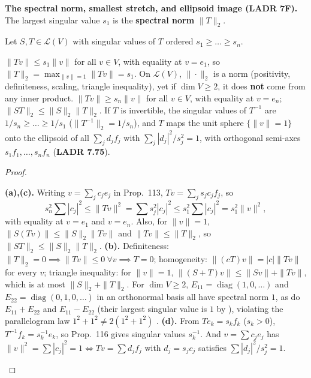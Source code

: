 \documentclass[10pt]{scrartcl}
\newcommand{\LL}{\mathcal L}\newcommand{\PP}{\mathcal P}\newcommand{\MM}{\mathcal M}
\begin{document}
\noindent\textbf{The spectral norm, smallest stretch, and ellipsoid image (LADR 7F).} The largest singular value $s_1$ is the \textbf{spectral norm} $\|T\|_2$.

\begin{theorem*}
  Let $S,T\in\LL(V)$ with singular values of $T$ ordered $s_1\ge\dots\ge s_n$.
  \begin{enumerate}
    \ii[(a)] $\|Tv\|\le s_1\|v\|$ for all $v\in V$, with equality at $v=e_1$, so $\|T\|_2 = \max_{\|v\|=1}\|Tv\| = s_1$.
    \ii[(b)] On $\LL(V)$, $\|\cdot\|_2$ is a norm (positivity, definiteness, scaling, triangle inequality), yet if $\dim V\ge2$, it does \textbf{not} come from any inner product.
    \ii[(c)] $\|Tv\|\ge s_n\|v\|$ for all $v\in V$, with equality at $v=e_n$; $\|ST\|_2\le\|S\|_2\|T\|_2$.
    \ii[(d)] If $T$ is invertible, the singular values of $T^{-1}$ are $1/s_n\ge\dots\ge 1/s_1$ ($\|T^{-1}\|_2=1/s_n$), and $T$ maps the unit sphere $\{\|v\|=1\}$ onto the ellipsoid of all $\sum_{j} d_j f_j$ with $\sum_{j} |d_j|^2/s_j^2 = 1$, with orthogonal semi-axes $s_1f_1,\dots,s_nf_n$ (\textbf{LADR 7.75}).
  \end{enumerate}
\end{theorem*}
\begin{proof}
  \begin{steps}
    \ii \textbf{(a),(c).} Writing $v=\sum_j c_j e_j$ in Prop.~113, $Tv=\sum_j s_j c_j f_j$, so
    \[ s_n^2\sum|c_j|^2 \le \|Tv\|^2 = \sum s_j^2|c_j|^2 \le s_1^2\sum|c_j|^2 = s_1^2\|v\|^2, \]
    with equality at $v=e_1$ and $v=e_n$. Also, for $\|v\|=1$, $\|S(Tv)\|\le\|S\|_2\|Tv\|$ and $\|Tv\|\le\|T\|_2$, so $\|ST\|_2\le\|S\|_2\|T\|_2$.
    \ii \textbf{(b).} Definiteness: $\|T\|_2=0\implies\|Tv\|\le0\ \forall v\implies T=0$; homogeneity: $\|(cT)v\|=|c|\|Tv\|$ for every $v$; triangle inequality: for $\|v\|=1$, $\|(S+T)v\|\le\|Sv\|+\|Tv\|$, which is at most $\|S\|_2+\|T\|_2$. For $\dim V\ge2$, $E_{11}=\operatorname{diag}(1,0,\dots)$ and $E_{22}=\operatorname{diag}(0,1,0,\dots)$ in an orthonormal basis all have spectral norm $1$, as do $E_{11}+E_{22}$ and $E_{11}-E_{22}$ (their largest singular value is $1$ by ), violating the parallelogram law $1^2+1^2\neq 2(1^2+1^2)$ .
    \ii \textbf{(d).} From $Te_k=s_kf_k$ ($s_k>0$), $T^{-1}f_k=s_k^{-1}e_k$, so Prop.~116 gives singular values $s_k^{-1}$. And $v=\sum c_je_j$ has $\|v\|^2=\sum|c_j|^2=1 \iff Tv=\sum d_jf_j$ with $d_j=s_jc_j$ satisfies $\sum|d_j|^2/s_j^2=1$.
  \end{steps}
\end{proof}
\end{document}
